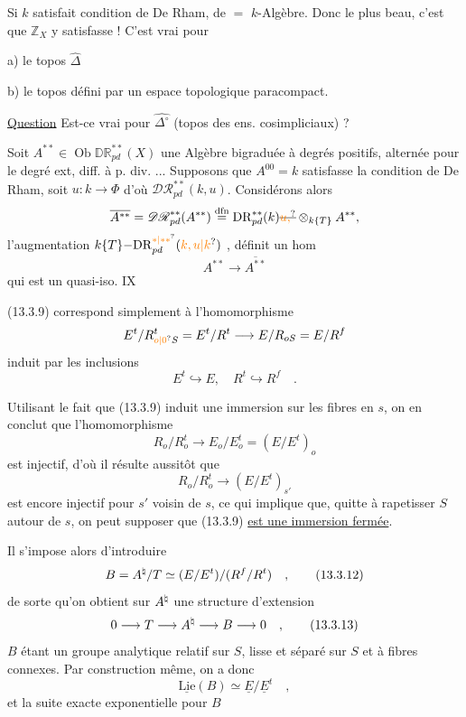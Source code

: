 Si $k$ satisfait condition de De Rham, de $=$  $k$-Algèbre. Donc le plus beau, c'est que $\mathbb Z_X$ y satisfasse ! C'est vrai pour

a) le topos  $\widehat{\Delta}$

b) le topos défini par un espace topologique paracompact.

\uline{Question} Est-ce vrai pour $\widehat{\Delta^\circ}$ (topos des ens. cosimpliciaux) ? 

Soit $A^{**}\in\operatorname{Ob}\mathbb{DR}^{**}_{pd}(X)$ une Algèbre bigraduée à degrés positifs, alternée pour le degré ext, diff. à p. div. ... Supposons que $A^{00}=k$ satisfasse la condition de De Rham, soit $u:k\longrightarrow\Phi$ d'où $\mathscr{DR}^{**}_{pd}(k,u)$. Considérons alors
\[
\overline{A^{**}}=\mathscr{DR}^{**}_{pd}(A^{**})\overset{\mathrm{dfn}}{=}\mathrm{DR}^{**}_{pd}(k)\deleted{\unsure{u,}}\otimes_{k\{T\}}A^{**},
\]
l'augmentation $k\{T\}\mathord{-}\mathrm{DR}_{pd}^{\unsure{*|**}}(\unsure{k,u|k})$ , définit un hom
\[
A^{**}\longrightarrow\overline{A^{**}}
\]
qui est un quasi-iso. 
\hfill IX

(13.3.9) correspond simplement à l'homomorphisme
\[
E^t/R_{\unsure{o|0}S}^t=E^t/R^t\longrightarrow E/R_{oS}=E/R^f
\]
induit par les inclusions
\[
E^t\hookrightarrow E,\quad R^t\hookrightarrow R^f\quad .
\]

Utilisant le fait que (13.3.9) induit une immersion sur les fibres en $s$, on en conclut que l'homomorphisme
\[
R_o/R_o^t\longrightarrow E_o/E_o^t=(E/E^t)_o
\]
est injectif, d'où il résulte aussitôt que
\[
R_o/R_o^t\longrightarrow(E/E^t)_{s'}
\]
est encore injectif pour $s'$ voisin de $s$, ce qui implique que, quitte à rapetisser $S$ autour de $s$, on peut supposer que (13.3.9) \uline{est une immersion fermée}.

Il s'impose alors d'introduire
\[
B=A^{\natural}/T\simeq(E/E^t)/(R^f/R^t)\quad , \tag*{(13.3.12)}
\]
de sorte qu'on obtient sur $A^{\natural}$ une structure d'extension
\[
0\longrightarrow T\longrightarrow A^{\natural}\longrightarrow B\longrightarrow 0\quad , \tag*{(13.3.13)}
\]
$B$ étant un groupe analytique relatif sur $S$, lisse et séparé sur $S$ et à fibres connexes. Par construction même, on a donc
\[
\underline{\mathrm{Lie}}(B)\simeq\underline E/\underline E^t\quad , \tag*{(13.3.14)}
\]
et la suite exacte exponentielle pour $B$

